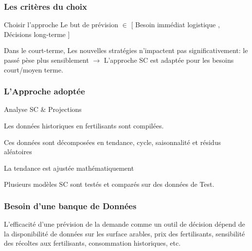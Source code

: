 \documentclass{beamer}
\begin{document}
	\begin{frame}
	\frametitle{Les critères du choix}
	
	\begin{block}{Choisir l'approche}
	Le but de prévision $ \in $ \footnotesize{ [ Besoin immédiat logistique , Décisions long-terme ] } \\
	\begin{block}{}
	Dans le court-terme, Les nouvelles stratégies n'impactent pas significativement: le passé pèse plus sensiblement $\rightarrow$  L'approche SC est adaptée pour les besoins court/moyen terme.
		\end{block}
		\end{block}
	\end{frame}
	\begin{frame}
	\frametitle{L'Approche adoptée}
	
	\begin{block}{Analyse SC \& Projections}
	\begin{itemize}
	\scriptsize{\item Les données historiques en fertilisants sont compilées.
	\item Ces données sont décomposées en tendance, cycle, saisonnalité et résidus aléatoires 
	\item La tendance est ajustée mathématiquement 
	\item Plusieurs modèles SC sont testés et comparés sur des données de Test.}
	\end{itemize}
	\end{block}
	\end{frame}
\begin{frame}
\frametitle{Besoin d'une banque de Données}
\begin{block}{}
\footnotesize{L'efficacité d'une prévision de la demande comme un outil de décision dépend de la disponibilité de données sur les surface arables, prix des fertilisants, sensibilité des récoltes aux fertilisants, consommation historiques, etc.}

\end{block}
\end{frame}
\end{document}
